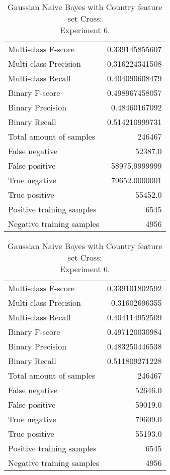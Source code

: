 \begin{table}[H]
\begin{minipage}{0.5\textwidth}
\caption{Gaussian Naive Bayes with Country feature set Cross: \\Experiment 5.}
\centering
\begin{tabular}{l r}
\toprule
Multi-class F-score & 0.339145855607 \\
Multi-class Precision & 0.316224341508 \\
Multi-class Recall & 0.404090608479 \\
\midrule
Binary F-score & 0.498967458057 \\
Binary Precision & 0.48460167092 \\
Binary Recall & 0.514210999731 \\
\midrule
Total amount of samples & 246467 \\
False negative & 52387.0 \\
False positive & 58975.9999999 \\
True negative & 79652.0000001 \\
True positive & 55452.0 \\
\midrule
Positive training samples & 6545 \\
Negative training samples & 4956 \\
\bottomrule
\end{tabular}
\end{minipage}
\hfillx
\begin{minipage}{0.5\textwidth}
\caption{Gaussian Naive Bayes with Country feature set Cross: \\Experiment 6.}
\centering
\begin{tabular}{l r}
\toprule
Multi-class F-score & 0.339101802592 \\
Multi-class Precision & 0.31602696355 \\
Multi-class Recall & 0.404114952509 \\
\midrule
Binary F-score & 0.497120030984 \\
Binary Precision & 0.483250446538 \\
Binary Recall & 0.511809271228 \\
\midrule
Total amount of samples & 246467 \\
False negative & 52646.0 \\
False positive & 59019.0 \\
True negative & 79609.0 \\
True positive & 55193.0 \\
\midrule
Positive training samples & 6545 \\
Negative training samples & 4956 \\
\bottomrule
\end{tabular}
\end{minipage}
\end{table}
